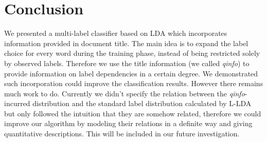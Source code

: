 \section{Conclusion}
\label{sec:conclude}

We presented a multi-label classifier based on LDA which incorporates information provided in document title. The main idea is to expand the label choice for every word during the training phase, instead of being restricted solely by observed labels. Therefore we use the title information (we called \emph{qinfo}) to provide information on label dependencies in a certain degree. We demonstrated such incorporation could improve the classification results. However there remains much work to do. Currently we didn't specify the relation between the \emph{qinfo}-incurred distribution and the standard label distribution calculated by L-LDA but only followed the intuition that they are somehow related, therefore we could improve our algorithm by modeling their relations in a definite way and giving quantitative descriptions. This will be included in our future investigation.